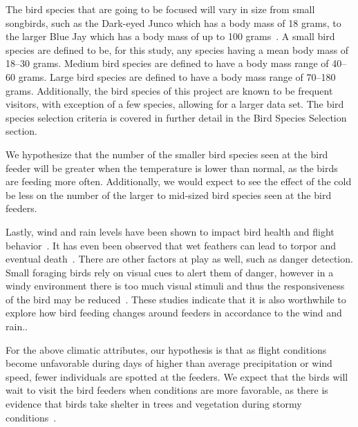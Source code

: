 The bird species that are going to be focused will vary in size from small songbirds, such as the Dark-eyed Junco which has a body mass of 18 grams, to the larger Blue Jay which has a body mass of up to 100 grams~\cite{AllAboutBirds:online}. A small bird species are defined to be, for this study, any species having a mean body mass of 18--30 grams. Medium bird species are defined to have a body mass range of 40--60 grams. Large bird species are defined to have a body mass range of 70--180 grams. Additionally, the bird species of this project are known to be frequent visitors, with exception of a few species, allowing for a larger data set. The bird species selection criteria is covered in further detail in the Bird Species Selection section. 

We hypothesize that the number of the smaller bird species seen at the bird feeder will be greater when the temperature is lower than normal, as the birds are feeding more often. Additionally, we would expect to see the effect of the cold be less on the number of the larger to mid-sized bird species seen at the bird feeders.  

Lastly, wind and rain levels have been shown to impact bird health and flight behavior~\cite{erni2002wind}. It has even been observed that wet feathers can lead to torpor and eventual death~\cite{kennedy1970direct}. There are other factors at play as well, such as danger detection. Small foraging birds rely on visual cues to alert them of danger, however in a windy environment there is too much visual stimuli and thus the responsiveness of the bird may be reduced~\cite{carr2010high}. These studies indicate that it is also worthwhile to explore how bird feeding changes around feeders in accordance to the wind and rain.. 

For the above climatic attributes, our hypothesis is that as flight conditions become unfavorable during days of higher than average precipitation or wind speed, fewer individuals are spotted at the feeders. We expect that the birds will wait to visit the bird feeders when conditions are more favorable, as there is evidence that birds take shelter in trees and vegetation during stormy conditions~\cite{kennedy1970direct}.  

